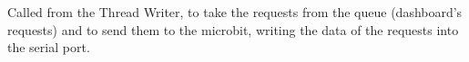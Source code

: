 \documentclass[letterpaper,10pt,english]{sphinxmanual}
\begin{document}

\begin{fulllineitems}
\label{\detokenize{index:threads.writer}}
Called from the Thread Writer, to take the requests from the queue (dashboard’s requests)
and to send them to the microbit, writing the data of the requests into the serial port.

\end{fulllineitems}



\renewcommand{\indexname}{Python Module Index}
\begin{sphinxtheindex}
\let\bigletter\sphinxstyleindexlettergroup
\bigletter{c}
\item\relax{}
\indexspace
\bigletter{r}
\item\relax{}
\indexspace
\bigletter{t}
\item\relax{}
\end{sphinxtheindex}

\renewcommand{\indexname}{Index}
\printindex
\end{document}
